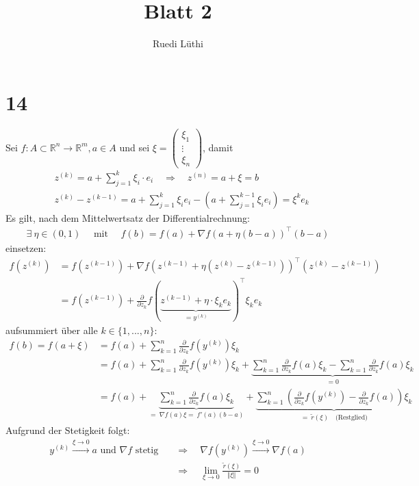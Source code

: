 \documentclass[11pt,a4paper]{article}
\author{Ruedi Lüthi}
\title{Blatt 2}
\newcommand {\Rn}	{\mathbb{R}^n}
\newcommand {\Rm}	{\mathbb{R}^m}
\newcommand{\1}    	{\mathbbm{1}}
\newcommand{\mitt}	{\textrm{ mit }}
\begin{document}
	\maketitle
	
	\section*{14}
	Sei \(f : A \subset \Rn \rightarrow \Rm, a \in A\) und sei \( \xi = \left( \begin{array}{c}
			\xi_1 \\ \vdots \\ \xi_n
		\end{array} \right) \), damit
	\begin{align*}
		&z^{(k)} = a + \sum_{j=1}^k \xi_i \cdot e_i 
		\quad\Rightarrow\quad z^{(n)} = a + \xi = b \\
		&z^{(k)} - z^{(k-1)} = a + \sum_{j=1}^{k} \xi_i e_i - 
		\left( a + \sum_{j=1}^{k-1} \xi_i e_i \right) = \xi^k e_k
	\end{align*}
	Es gilt, nach dem Mittelwertsatz der Differentialrechnung:
	\begin{align*}
		\exists~ \eta \in (0,1) \quad\mitt\quad f(b) = f(a) + \nabla f\left(a + \eta(b-a)\right)^\top(b-a)
	\end{align*}
	einsetzen:
	\begin{align*}
		f(z^{(k)}) &= f(z^{(k-1)}) + \nabla f\left(z^{(k-1)} + \eta(z^{(k)} - z^{(k-1)})\right)^\top(z^{(k)} - z^{(k-1)}) \\
		&= f(z^{(k-1)}) + \frac{\partial}{\partial z_k} 
		f\left(
			\underbrace{ z^{(k-1)} + \eta \cdot \xi_k e_k}
			_{= y^{(k)}}
		\right)^\top \xi_k e_k
	\end{align*}
	aufsummiert über alle \(k \in \{1, ..., n\}\):
	\begin{align*}
		f(b) = f(a+\xi) &= f(a) + \sum_{k=1}^n \frac{\partial}{\partial z_k} f\left(y^{(k)}\right) \xi_k \\
		&= f(a) + \sum_{k=1}^n \frac{\partial}{\partial z_k} f\left(y^{(k)}\right) \xi_k + 
		\underbrace{
			\sum_{k=1}^n \frac{\partial}{\partial z_k} f(a) \xi_k - 
			\sum_{k=1}^n \frac{\partial}{\partial z_k} f(a) \xi_k
		}_{=0} \\
		&= f(a) + 
		\underbrace{
			\sum_{k=1}^n \frac{\partial}{\partial z_k} f(a) \xi_k
		}_{
			=~ \nabla f(a) \xi =~ f'(a)(b-a)
		}
		+
		\underbrace{
			\sum_{k=1}^n \left(
				\frac{\partial}{\partial z_k} f\left(y^{(k)}\right) -
				\frac{\partial}{\partial z_k} f(a)
			\right) \xi_k
		}_{
			=~ \tilde{r}(\xi) \quad \textrm{(Restglied)}
		}
	\end{align*}
	Aufgrund der Stetigkeit folgt:
	\begin{align*}
		y^{(k)} \stackrel{\xi \rightarrow 0}{\rightarrow} a \textrm{ und }
		\nabla f \textrm{ stetig} & \quad \Rightarrow \quad
		\nabla f(y^{(k)}) \stackrel{\xi \rightarrow 0}{\rightarrow} \nabla f(a) \\
		 & \quad \Rightarrow \quad \lim_{\xi \rightarrow 0} \frac{\tilde{r}(\xi)}{\Vert \xi \Vert} = 0
	\end{align*}
		
\end{document}
